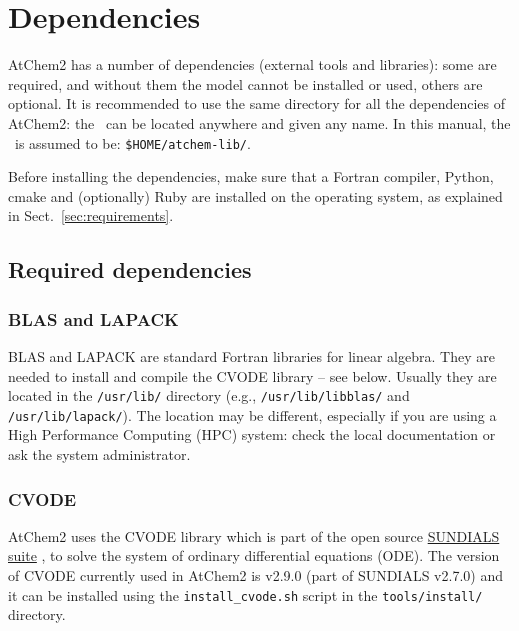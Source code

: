 \section{Dependencies} \label{sec:dependencies}

AtChem2 has a number of dependencies (external tools and libraries):
some are required, and without them the model cannot be installed or
used, others are optional. It is recommended to use the same directory
for all the dependencies of AtChem2: the \depdir\ can be located
anywhere and given any name. In this manual, the \depdir\ is
assumed to be: \texttt{\$HOME/atchem-lib/}.

Before installing the dependencies, make sure that a Fortran compiler,
Python, cmake and (optionally) Ruby are installed on the operating
system, as explained in Sect.~\ref{sec:requirements}.

\subsection{Required dependencies} \label{subsec:required-dependencies}

\subsubsection{BLAS and LAPACK}

BLAS and LAPACK are standard Fortran libraries for linear
algebra. They are needed to install and compile the CVODE library --
see below. Usually they are located in the \texttt{/usr/lib/}
directory (e.g., \texttt{/usr/lib/libblas/} and
\texttt{/usr/lib/lapack/}). The location may be different, especially
if you are using a High Performance Computing (HPC) system: check the
local documentation or ask the system administrator.

\subsubsection{CVODE}

AtChem2 uses the CVODE library which is part of the open source
\href{https://computation.llnl.gov/projects/sundials/}{SUNDIALS suite}
\citep{hindmarsh_2005}, to solve the system of ordinary differential
equations (ODE). The version of CVODE currently used in AtChem2 is
v2.9.0 (part of SUNDIALS v2.7.0) and it can be installed using the
\texttt{install\_cvode.sh} script in the \texttt{tools/install/}
directory.

